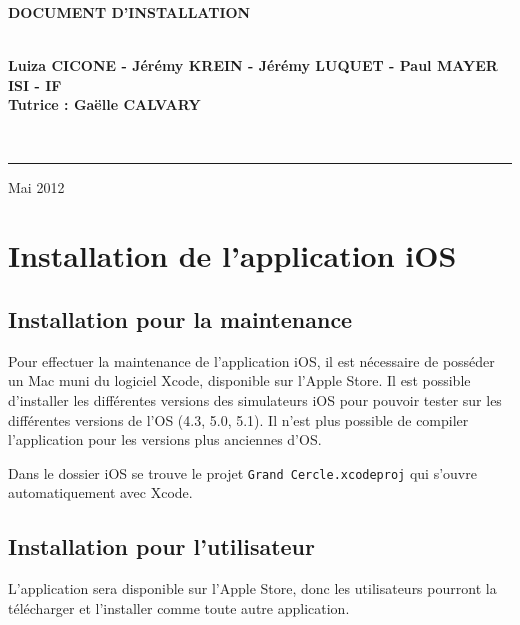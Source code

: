 \documentclass[a4paper, 11px]{article}
\begin{document}
\begin{titlepage}
\begin{center}
\begin{center}
{\Huge \bf DOCUMENT D'INSTALLATION}


\end{center}


\vspace{1cm}

\begin{center}
$ $\\
\large{ \textbf{Luiza CICONE - Jérémy KREIN - Jérémy LUQUET - Paul MAYER}}\\
\large{ \textbf{ISI - IF}}\\
\large{ \textbf{Tutrice : Gaëlle CALVARY}}

$ $\\
\end{center}
\rule{\linewidth}{.5pt}


\vfill


{\large Mai 2012}

\end{center}
\end{titlepage}

\tableofcontents

\newpage


\section{Installation de l'application iOS}
\subsection{Installation pour la maintenance}
Pour effectuer la maintenance de l'application iOS, il est nécessaire de posséder un Mac muni du logiciel Xcode, disponible sur l'Apple Store. 
Il est possible d'installer les différentes versions des simulateurs iOS pour pouvoir tester sur les différentes versions de l'OS (4.3, 5.0, 5.1). Il n'est plus possible de compiler l'application pour les versions plus anciennes d'OS.

Dans le dossier iOS se trouve le projet \lstinline!Grand Cercle.xcodeproj! qui s'ouvre automatiquement avec Xcode.

\subsection{Installation pour l'utilisateur}
L'application sera disponible sur l'Apple Store, donc les utilisateurs pourront la télécharger et l'installer comme toute autre application.
\end{document}
